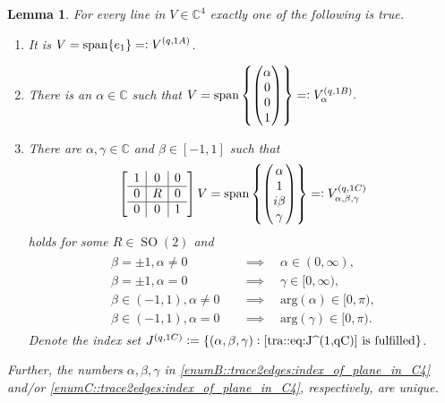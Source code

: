 \documentclass{amsart}
\newtheorem{lemma}[thm]{Lemma}
\newcommand{\C}{\mathbb{C}}
\DeclareMathOperator{\SO}{SO}
\DeclareMathOperator{\spann}{span}
\begin{document}
\begin{lemma}
\label{ntg::lemma:Pauli_spaces_for_qgraphs_with_one_edge_on_M2,psi_q}
    For every line in $V\in\C^4$ exactly one of the following is true.
    \begin{enumerate}[label=(\Alph*)]
        \item\label{enumA::trace2edges:index_of_plane_in_C4} It is $\displaystyle V  = \spann \{e_1\}=\vcentcolon V^{(q,1A)}$.
        \item\label{enumB::trace2edges:index_of_plane_in_C4} There is an $\alpha \in \C$ such that 
        $\displaystyle V 
        =\spann\left\{ \begin{pmatrix}
            \alpha \\ 0 \\ 0 \\ 1
        \end{pmatrix} \right\}
        =\vcentcolon V^{(q,1B)}_{\alpha}.$
        \item\label{enumC::trace2edges:index_of_plane_in_C4} There are $\alpha, \gamma \in \C$ and $\beta \in [-1, 1]$ such that
        \begin{align*}
        \left[\begin{array}{c|c|c}
            1 & 0 & 0\\
            \hline
            0 & R & 0 \\
            \hline
            0 & 0 & 1
            \end{array}\right]
        \displaystyle V
        =  \spann\left\{ \begin{pmatrix}
            \alpha \\ 1 \\ i \beta \\ \gamma
        \end{pmatrix} \right\}
        =\vcentcolon V^{(q,1C)}_{\alpha,\beta,\gamma}
        \end{align*}
        holds for some $R \in \SO(2)$ and
        \begin{align}
        \label{tra::eq:J^(1,qC)}\tag{$\ast$}
        \begin{aligned}
                \beta = \pm 1, \alpha \neq 0 \quad &\implies \quad \alpha \in (0, \infty), \\
                \beta = \pm 1, \alpha = 0 \quad &\implies \quad \gamma \in [0, \infty), \\
                \beta \in (-1,1), \alpha \neq 0 \quad &\implies \quad \mathrm{arg}(\alpha) \in [0, \pi), \\
                \beta \in (-1,1), \alpha = 0 \quad &\implies \quad \mathrm{arg}(\gamma) \in [0, \pi).
            \end{aligned}
        \end{align}
        Denote the index set $
        J^{(q,1C)}\vcentcolon=
        \{(\alpha,\beta,\gamma)\vcentcolon\text{\eqref{tra::eq:J^(1,qC)} is fulfilled}\}$.
    \end{enumerate}
    Further, the numbers $\alpha,\beta,\gamma$ in \ref{enumB::trace2edges:index_of_plane_in_C4} and/or \ref{enumC::trace2edges:index_of_plane_in_C4}, respectively, are unique.
\end{lemma}
\end{document}
